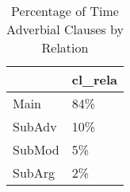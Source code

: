 \begin{table}[htbp!]
\centering
\caption{Percentage of Time Adverbial Clauses by Relation}
\label{table:rel_pr}
\begin{tabular}{ll}
\toprule
{} & cl\_rela \\
\midrule
Main   &     84\% \\
SubAdv &     10\% \\
SubMod &      5\% \\
SubArg &      2\% \\
\bottomrule
\end{tabular}
\end{table}
